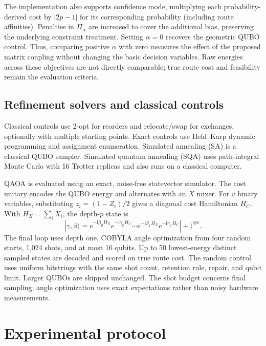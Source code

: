 \documentclass[11pt,a4paper]{article}
\begin{document}
The implementation also supports confidence mode, multiplying each
probability-derived cost by $|2p-1|$ for its corresponding probability
(including route affinities). Penalties in $\Pi_\alpha$ are increased to
cover the additional bias, preserving the underlying constraint treatment.
Setting $\alpha=0$ recovers the geometric QUBO control. Thus, comparing
positive $\alpha$ with zero measures the effect of the proposed matrix
coupling without changing the basic decision variables. Raw energies across
these objectives are not directly comparable; true route cost and feasibility
remain the evaluation criteria.

\subsection{Refinement solvers and classical controls}

Classical controls use 2-opt for reorders and relocate/swap for exchanges,
optionally with multiple starting points. Exact controls use Held--Karp
dynamic programming and assignment enumeration. Simulated annealing (SA)
is a classical QUBO sampler. Simulated quantum annealing (SQA) uses
path-integral Monte Carlo with 16 Trotter replicas and also runs on a classical
computer.

QAOA is evaluated using an exact, noise-free statevector simulator.
The cost unitary encodes the QUBO energy and alternates with an $X$ mixer.
For $v$ binary variables, substituting $z_i=(1-Z_i)/2$ gives a diagonal
cost Hamiltonian $H_C$. With $H_X=\sum_i X_i$, the depth-$p$ state is
\begin{equation}
 |\gamma,\beta\rangle=
 e^{-\mathrm i\beta_p H_X}e^{-\mathrm i\gamma_p H_C}\cdots
 e^{-\mathrm i\beta_1 H_X}e^{-\mathrm i\gamma_1 H_C}
 |+\rangle^{\otimes v}.
 \label{eq:qaoa-state}
\end{equation}
The final loop uses depth one, COBYLA angle optimization from four random
starts, 1,024 shots, and at most 16 qubits. Up to 50 lowest-energy distinct
sampled states are decoded and scored on true route cost. The random control
uses uniform bitstrings with the same shot count, retention rule, repair, and
qubit limit. Larger QUBOs are skipped unchanged. The shot budget concerns
final sampling; angle optimization uses exact expectations rather than noisy
hardware measurements.

\section{Experimental protocol}
\label{sec:protocol}
\end{document}
